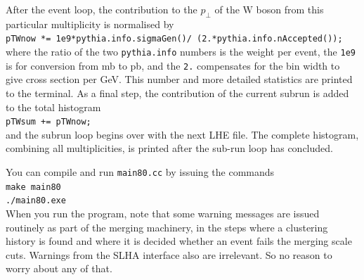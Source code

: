 \documentclass[12pt,a4paper]{article}
\newcommand{\W}{{\mathrm W}}
\begin{document}
After the event loop, the contribution to the $p_{\perp}$ of the 
$\W$ boson from this particular multiplicity is normalised by\\
\hspace*{10mm}\texttt{pTWnow *= 1e9*pythia.info.sigmaGen()/%
(2.*pythia.info.nAccepted());}\\
where the ratio of the two \texttt{pythia.info} numbers is the weight per 
event, the \texttt{1e9} is for conversion from mb to pb, and the \texttt{2.}
compensates for the bin width to give cross section per GeV.
This number and more detailed statistics are printed to the terminal. 
As a final step, the contribution of the current subrun is added to 
the total histogram\\
\hspace*{10mm}\texttt{pTWsum += pTWnow;}\\
and the subrun loop begins over with the next LHE file. The complete 
histogram, combining all multiplicities, is printed after the sub-run 
loop has concluded. 

You can compile and run \texttt{main80.cc} by issuing the commands\\
\hspace*{10mm}\texttt{make main80}\\
\hspace*{10mm}\texttt{./main80.exe}\\
When you run the program, note that some warning messages are issued 
routinely as part of the merging machinery, in the steps where a 
clustering history is found and where it is decided whether an event
fails the merging scale cuts. Warnings from the SLHA interface also
are irrelevant. So no reason to worry about any of that.
\end{document}
